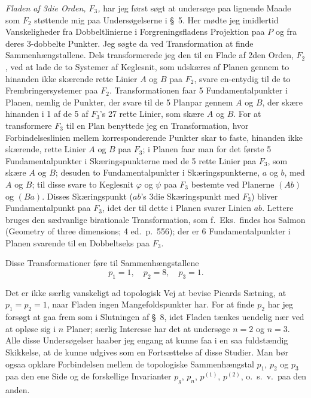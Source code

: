 \documentclass{article}
\begin{document}
\emph{Fladen af 3die Orden, $F_3$,} har jeg først søgt at undersøge paa lignende Maade som $F_2$ støttende mig paa Undersøgelserne i \S~5. Her mødte jeg imidlertid Vanskeligheder fra Dobbeltlinierne i Forgreningsfladens Projektion paa $P$ og fra deres 3-dobbelte Punkter. Jeg søgte da ved Transformation at finde Sammenhængstallene. Dels transformerede jeg den til en Flade af 2den Orden, $F_2$, ved at lade de to Systemer af Keglesnit, som udskæres af Planen gennem to hinanden ikke skærende rette Linier $A$ og $B$ paa $F_2$, svare en-entydig til de to Frembringersystemer paa $F_2$. Transformationen faar 5 Fundamentalpunkter i Planen, nemlig de Punkter, der svare til de 5 Planpar gennem $A$ og $B$, der skære hinanden i 1 af de 5 af $F_3$'s 27 rette Linier, som skære $A$ og $B$. For at transformere $F_3$ til en Plan benyttede jeg en Transformation, hvor Forbindelseslinien mellem korresponderende Punkter skar to faste, hinanden ikke skærende, rette Linier $A$ og $B$ paa $F_3$; i Planen faar man for det første 5 Fundamentalpunkter i Skæringspunkterne med de 5 rette Linier paa $F_3$, som skære $A$ og $B$; desuden to Fundamentalpunkter i Skæringspunkterne, $a$ og $b$, med $A$ og $B$; til disse svare to Keglesnit $\varphi$ og $\psi$ paa $F_3$ bestemte ved Planerne $(Ab)$ og $(Ba)$. Disses Skæringspunkt ($ab$'s 3die Skæringspunkt med $F_3$) bliver Fundamentalpunkt paa $F_3$, idet der til dette i Planen svarer Linien $ab$. Lettere bruges den sædvanlige birationale Transformation, som f.\ Eks.\ findes hos Salmon (Geometry of three dimensions; 4 ed.\ p.\ 556); der er 6 Fundamentalpunkter i Planen svarende til en Dobbeltseks paa $F_3$.

Disse Transformationer føre til Sammenhængstallene
\[
p_1 = 1, \quad p_2 = 8, \quad p_3 = 1.
\]

Det er ikke særlig vanskeligt ad topologisk Vej at bevise Picards Sætning, at $p_1 = p_2 = 1$, naar Fladen ingen Mangefoldspunkter har. For at finde $p_2$ har jeg forsøgt at gaa frem som i Slutningen af \S~8, idet Fladen tænkes uendelig nær ved at opløse sig i $n$ Planer; særlig Interesse har det at undersøge $n = 2$ og $n = 3$. Alle disse Undersøgelser haaber jeg engang at kunne faa i en saa fuldstændig Skikkelse, at de kunne udgives som en Fortsættelse af disse Studier. Man bør ogsaa opklare Forbindelsen mellem de topologiske Sammenhængstal $p_1$, $p_2$ og $p_3$ paa den ene Side og de forskellige Invarianter $p_g$, $p_n$, $p^{(1)}$, $p^{(2)}$, o.\ s.\ v.\ paa den anden.
\end{document}
